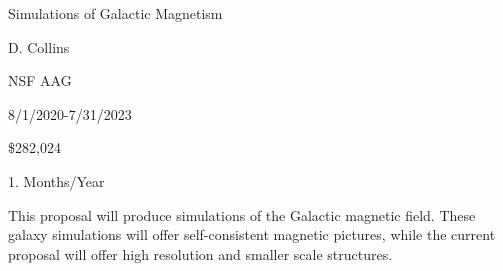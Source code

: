 \documentclass[10pt]{article}
\begin{document}
 Simulations of Galactic Magnetism

 D. Collins

 NSF AAG 

 8/1/2020-7/31/2023  

 \$282,024

 1. Months/Year

 This proposal will produce simulations of the Galactic
magnetic field.  These galaxy simulations will offer self-consistent magnetic
pictures, while the current proposal will offer high resolution and smaller
scale structures.  


\vspace{0.1in}
\end{document}
